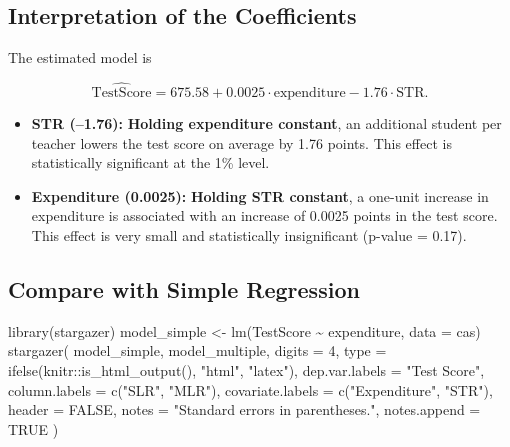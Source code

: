 \documentclass[
  12pt,
  letterpaper,
]{scrbook}
\newenvironment{Shaded}{\begin{snugshade}}{\end{snugshade}}
\newcommand{\AttributeTok}[1]{\textcolor[rgb]{0.40,0.45,0.13}{#1}}
\newcommand{\ConstantTok}[1]{\textcolor[rgb]{0.56,0.35,0.01}{#1}}
\newcommand{\DecValTok}[1]{\textcolor[rgb]{0.68,0.00,0.00}{#1}}
\newcommand{\FunctionTok}[1]{\textcolor[rgb]{0.28,0.35,0.67}{#1}}
\newcommand{\NormalTok}[1]{\textcolor[rgb]{0.00,0.23,0.31}{#1}}
\newcommand{\OtherTok}[1]{\textcolor[rgb]{0.00,0.23,0.31}{#1}}
\newcommand{\SpecialCharTok}[1]{\textcolor[rgb]{0.37,0.37,0.37}{#1}}
\newcommand{\StringTok}[1]{\textcolor[rgb]{0.13,0.47,0.30}{#1}}
\providecommand{\tightlist}{%
  \setlength{\itemsep}{0pt}\setlength{\parskip}{0pt}}
\renewcommand{\tightlist}{\setlength{\itemsep}{0.5\baselineskip}\setlength{\parskip}{0.2\baselineskip}}
\theoremstyle{plain}
\theoremstyle{definition}
\theoremstyle{remark}
\begin{document}
\subsection{Interpretation of the
Coefficients}\label{interpretation-of-the-coefficients}

The estimated model is

\[
\widehat{\text{TestScore}} = 675.58 + 0.0025 \cdot \text{expenditure} - 1.76 \cdot \text{STR}.
\]

\begin{itemize}
\tightlist
\item
  \textbf{STR (--1.76):} \textbf{Holding expenditure constant}, an
  additional student per teacher lowers the test score on average by
  1.76 points. This effect is statistically significant at the 1\%
  level.
\item
  \textbf{Expenditure (0.0025):} \textbf{Holding STR constant}, a
  one-unit increase in expenditure is associated with an increase of
  0.0025 points in the test score. This effect is very small and
  statistically insignificant (p-value = 0.17).
\end{itemize}

\subsection{Compare with Simple
Regression}\label{compare-with-simple-regression}

\begin{Shaded}
\begin{Highlighting}[]
\FunctionTok{library}\NormalTok{(stargazer)}
\NormalTok{model\_simple }\OtherTok{\textless{}{-}} \FunctionTok{lm}\NormalTok{(TestScore }\SpecialCharTok{\textasciitilde{}}\NormalTok{ expenditure, }\AttributeTok{data =}\NormalTok{ cas)}
\FunctionTok{stargazer}\NormalTok{(}
\NormalTok{    model\_simple, model\_multiple,}
    \AttributeTok{digits =} \DecValTok{4}\NormalTok{,}
    \AttributeTok{type =} \FunctionTok{ifelse}\NormalTok{(knitr}\SpecialCharTok{::}\FunctionTok{is\_html\_output}\NormalTok{(), }\StringTok{"html"}\NormalTok{, }\StringTok{"latex"}\NormalTok{),}
    \AttributeTok{dep.var.labels =} \StringTok{"Test Score"}\NormalTok{,}
    \AttributeTok{column.labels =} \FunctionTok{c}\NormalTok{(}\StringTok{"SLR"}\NormalTok{, }\StringTok{"MLR"}\NormalTok{),}
    \AttributeTok{covariate.labels =} \FunctionTok{c}\NormalTok{(}\StringTok{"Expenditure"}\NormalTok{, }\StringTok{"STR"}\NormalTok{),}
    \AttributeTok{header =} \ConstantTok{FALSE}\NormalTok{,}
    \AttributeTok{notes =} \StringTok{"Standard errors in parentheses."}\NormalTok{,}
    \AttributeTok{notes.append =} \ConstantTok{TRUE}
\NormalTok{)}
\end{Highlighting}
\end{Shaded}
\end{document}

